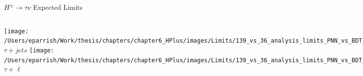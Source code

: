 \documentclass[aspectratio=169,xcolor=table]{beamer}
\begin{document}
  \begin{frame}{$H^{\pm} \rightarrow \tau\nu$ Expected Limits}
    \centering
    \small
    \begin{columns}
      \texttt{[image: /Users/eparrish/Work/thesis/chapters/chapter6\_HPlus/images/Limits/139\_vs\_36\_analysis\_limits\_PNN\_vs\_BDT\_TauJets\_logx.png]} \\
      \centering
      $\tau+jets$
      \texttt{[image: /Users/eparrish/Work/thesis/chapters/chapter6\_HPlus/images/Limits/139\_vs\_36\_analysis\_limits\_PNN\_vs\_BDT\_TauLep\_logx.png]} \\
      \centering
      $\tau+\ell$
    \end{columns}
  \end{frame}
\end{document}
